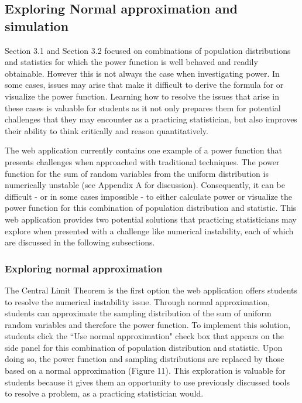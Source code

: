 \documentclass{TISE}
\begin{document}
\subsection{Exploring Normal approximation and simulation}

Section 3.1 and Section 3.2 focused on combinations of population distributions and statistics for which the power function is well behaved and readily obtainable. However this is not always the case when investigating power. In some cases, issues may arise that make it difficult to derive the formula for or visualize the power function. Learning how to resolve the issues that arise in these cases is valuable for students as it not only prepares them for potential challenges that they may encounter as a practicing statistician, but also improves their ability to think critically and reason quantitatively. 

The web application currently contains one example of a power function that presents challenges when approached with traditional techniques. The power function for the sum of random variables from the uniform distribution is numerically unstable (see Appendix A for discussion). Consequently, it can be difficult - or in some cases impossible - to either calculate power or visualize the power function for this combination of population distribution and statistic. This web application provides two potential solutions that practicing statisticians may explore when presented with a challenge like numerical instability, each of which are discussed in the following subsections.

\subsubsection{Exploring normal approximation}

The Central Limit Theorem is the first option the web application offers students to resolve the numerical instability issue. Through normal approximation, students can approximate the sampling distribution of the sum of uniform random variables and therefore the power function. To implement this solution, students click the ``Use normal approximation" check box that appears on the side panel for this combination of population distribution and statistic. Upon doing so, the power function and sampling distributions are replaced by those based on a normal approximation (Figure 11). This exploration is valuable for students because it gives them an opportunity to use previously discussed tools to resolve a problem, as a practicing statistician would. 
\end{document}
